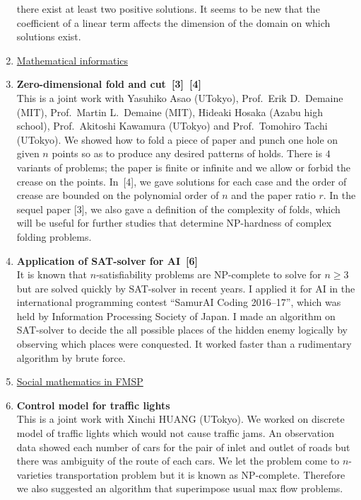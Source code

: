\begin{enumerate}
       there exist at least two positive solutions.
       It seems to be new that the coefficient of a linear term affects
       the dimension of the domain on which solutions exist.
 \item[] \underline{Mathematical informatics}
 \item {\bf Zero-dimensional fold and cut~[3]~[4]} \\
       This is a joint work with
       Yasuhiko Asao (UTokyo), Prof.~Erik D.~Demaine (MIT),
       Prof.~Martin L.~Demaine (MIT), Hideaki Hosaka (Azabu high school),
       Prof.~Akitoshi Kawamura (UTokyo)
       and Prof.~Tomohiro Tachi (UTokyo).
       We showed how to fold a piece of paper and punch one hole
       on given $n$ points
       so as to produce any desired patterns of holds.
       There is $4$ variants of problems;
       the paper is finite or infinite
       and we allow or forbid the crease on the points.
       In~[4], we gave solutions for each case and the order of crease
       are bounded on the polynomial order of $n$ and the paper ratio
       $r$.
       In the sequel paper [3], we also gave a definition of
       the complexity of folds, which
       will be useful for further studies that determine
       NP-hardness of complex folding problems.
 \item {\bf Application of SAT-solver for AI~[6]} \\
       It is known that $n$-satisfiability problems are NP-complete
       to solve for $n \geq 3$
       but are solved quickly by SAT-solver in recent years.
       I applied it for AI in the international
       programming contest ``SamurAI Coding
       2016--17'', which was held by Information
       Processing Society of Japan. I made an algorithm on SAT-solver
       to decide the all possible places of the hidden enemy logically
       by observing which places were conquested.
       It worked faster than a rudimentary algorithm by brute force.
 \item[] \underline{Social mathematics in FMSP}
 \item {\bf Control model for traffic lights} \\
       This is a joint work with Xinchi HUANG (UTokyo).
       We worked on discrete model of traffic lights which would not
       cause traffic jams.
       An observation data showed each number of cars for the pair of
       inlet and outlet of roads but there was ambiguity of
       the route of each cars.
       We let the problem come to
       $n$-varieties transportation problem but it is known as
       NP-complete. Therefore we also suggested an algorithm
       that superimpose usual max flow problems.
\end{enumerate}

